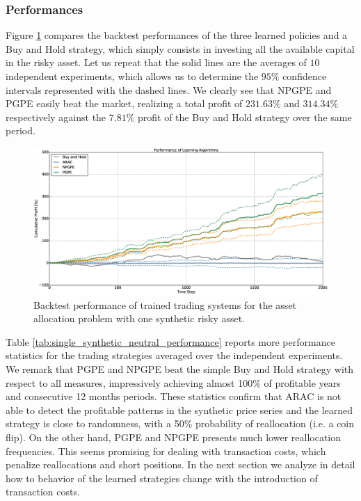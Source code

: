 \subsubsection{Performances}
Figure \ref{fig:single_synthetic_neutral_performance} compares the backtest performances of the three learned policies and a Buy and Hold strategy, which simply consists in investing all the available capital in the risky asset. Let us repeat that the solid lines are the averages of $10$ independent experiments, which allows us to determine the $95\%$ confidence intervals represented with the dashed lines. We clearly see that NPGPE and PGPE easily beat the market, realizing a total profit of $231.63\%$ and $314.34\%$ respectively against the $7.81\%$ profit of the Buy and Hold strategy over the same period.
\begin{figure}[t]
	\centering
	\includegraphics[width=1.0\textwidth]{Images/6_1_single_synthetic_neutral_performance}
	\caption[Backtest performance with one synthetic risky asset]{Backtest performance of trained trading systems for the asset allocation problem with one synthetic risky asset.}
	\label{fig:single_synthetic_neutral_performance}
\end{figure}
Table \ref{tab:single_synthetic_neutral_performance} reports more performance statistics for the trading strategies averaged over the independent experiments. We remark that PGPE and NPGPE beat the simple Buy and Hold strategy with respect to all measures, impressively achieving almost 100\% of profitable years and consecutive 12 months periods. These statistics confirm that ARAC is not able to detect the profitable patterns in the synthetic price series and the learned strategy is close to randomness, with a 50\% probability of reallocation (i.e. a coin flip). On the other hand, PGPE and NPGPE presents much lower reallocation frequencies. This seems promising for dealing with transaction costs, which penalize reallocations and short positions. In the next section we analyze in detail how to behavior of the learned strategies change with the introduction of transaction costs. 


